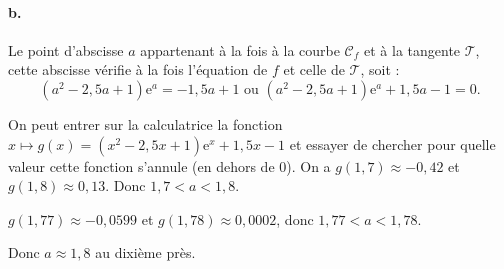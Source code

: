 \documentclass[10pt]{article}
\providecommand{\e}{{\mathrm{e}}}
\begin{document}
\paragraph{b.} Le point d'abscisse \(a\) appartenant à la fois à la courbe \(\mathcal{C}_f\) et à la tangente \(\mathcal{T}\), cette abscisse vérifie à la fois l'équation de \(f\) et celle de \(\mathcal{T}\), soit :
\[
(a^2 - 2{,}5a + 1) \e^a = -1{,}5a + 1 \text{ ou } (a^2 - 2{,}5a + 1) \e^a + 1{,}5a - 1 = 0.
\]

On peut entrer sur la calculatrice la fonction \( x \longmapsto g(x) = (x^2 - 2{,}5x + 1) \e^x + 1{,}5x - 1 \) et essayer de chercher pour quelle valeur cette fonction s'annule (en dehors de 0). On a \( g(1{,}7) \approx -0{,}42 \) et \( g(1{,}8) \approx 0{,}13 \). Donc \( 1{,}7 < a < 1{,}8 \).

\( g(1{,}77) \approx -0{,}0599 \) et \( g(1{,}78) \approx 0{,}0002 \), donc \( 1{,}77 < a < 1{,}78 \).

Donc \( a \approx 1{,}8 \) au dixième près.
\end{document}
